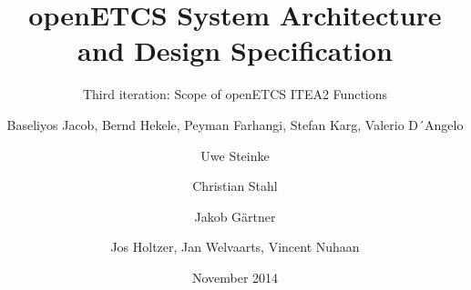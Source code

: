 \documentclass{template/openetcs_report}
\begin{document}
\frontmatter
{}

\newcommand{\define}[1]{\index{#1}\emph{#1}}







%




\title{openETCS System Architecture and Design Specification}

\subtitle{Third iteration: Scope of openETCS ITEA2 Functions}

\date{November 2014}



\techassessoraffil{[affiliation]}





\author{Baseliyos Jacob, Bernd Hekele, Peyman Farhangi, Stefan Karg, Valerio D´Angelo}


\author{Uwe Steinke}


\author{Christian Stahl}


\author{Jakob Gärtner}

\author{Jos Holtzer, Jan Welvaarts, Vincent Nuhaan}

\end{document}
